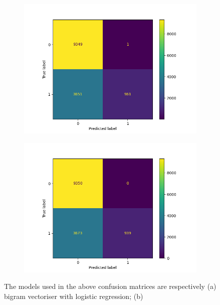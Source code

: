 \begin{figure}
\begin{subfigure}[b]{0.245\textwidth}
            \includegraphics[scale=0.35]{"../figs/fig_content_title/fig_KNN_7_content_title.png"}
            \caption{}
        \end{subfigure}
        \begin{subfigure}[b]{0.245\textwidth}  
            \centering 
            \includegraphics[scale=0.35]{"../figs/fig_content_title/fig_KNN_10_content_title.png"}
            \caption{}
        \end{subfigure}
        \caption{The models used in the above confusion matrices are respectively (a) bigram vectoriser with logistic regression; (b)}
    \end{figure}
